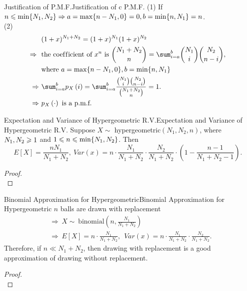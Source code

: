 \documentclass{elegantbook}
\begin{document}
\begin{remark}{Justif\/ication of P.M.F.}{Justification of c P.M.F.}
(1) If $n\leqslant\min\{N_1,N_2\}\Rightarrow a=\max\{n-N_1,0\}=0,b=\min\{n,N_1\}=n$.\\
(2) 
$$
\begin{aligned}
&(1+x)^{N_1+N_2}=(1+x)^{N_1}(1+x)^{N_2}\\
\Rightarrow\ \ &\text{the coef\/f\/icient of } x^n \text{ is }
\binom{N_1+N_2}{n}=\sum_{i=a}^{b}\binom{N_1}{i}\binom{N_2}{n-i},\\
&\text{where} \ a=\max\{n-N_1,0\},b=\min\{n,N_1\} \\
\Rightarrow\ &\sum_{i=a}^{b}{p_X\left(i\right)}=\sum_{i=a}^{b}\frac{\binom{N_1}{i}\binom{N_2}{n-i}}{\binom{N_1+N_2}{n}}=1.\\
\Rightarrow\ &p_X\left(\cdot\right)\ \text{is a p.m.f.}
\end{aligned}
$$
\end{remark}

\begin{theorem}{Expectation and Variance of Hypergeometric R.V.}{Expectation and Variance of Hypergeometric R.V.}
Suppose $X\sim$ hypergeometric$(N_1,N_2,n)$, where $N_1,N_2\geqslant1$ and $1\leqslant n\leqslant\min\{N_1,N_2\}$. Then
$$
E\left[X\right]=\frac{nN_1}{N_1+N_2},\ 
Var(x)=n\cdot\frac{N_1}{N_1+N_2}\cdot\frac{N_2}{N_1+N_2}\cdot\left(1-\frac{n-1}{N_1+N_2-1}\right).
$$
\end{theorem}

\begin{proof}
\\[4cm]\vspace{0.01cm}
\end{proof}

\begin{theorem}{Binomial Approximation for Hypergeometric}{Binomial Approximation for Hypergeometric}
$n$ balls are drawn with replacement
$$\begin{aligned}
  &\Rightarrow\ X\sim\ \mathrm{binomial}\left(n,\frac{N_1}{N_1+N_2}\right)\\
&\Rightarrow\ E\left[X\right]=n\cdot\frac{N_1}{N_1+N_2},\ \ Var(x)=n\cdot\frac{N_1}{N_1+N_2}\cdot\frac{N_2}{N_1+N_2}.
\end{aligned}
$$
Therefore, if $n\ll N_1+N_2$, then drawing with replacement is a good approximation of drawing without replacement.
\end{theorem}

\begin{proof}
\\[4cm]\vspace{0.01cm}
\end{proof}
\end{document}
